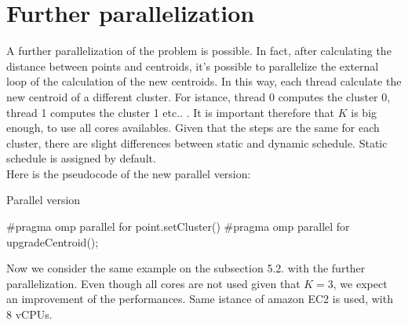 \documentclass[10pt,twocolumn,letterpaper]{article}
\begin{document}
\section{Further parallelization}
A further parallelization of the problem is possible. In fact, after calculating the distance between points and centroids, it's possible to
parallelize the external loop of the calculation of the new centroids. In this way, each thread calculate the new centroid of a different cluster.
For istance, thread 0 computes the cluster 0, thread 1 computes the cluster 1 etc.. . It is important therefore that $K$ is big enough, to use 
all cores availables. Given that the steps are the same for each cluster, there are slight differences between static and dynamic schedule.
Static schedule is assigned by default.\\
Here is the pseudocode of the new parallel version:
\begin{algorithm}
\label{newparallelo}
\caption{Parallel version}
\begin{algorithmic}
		\State \#pragma omp parallel for
			\State point.setCluster()
		\EndFor
		\State \#pragma omp parallel for
    		\State upgradeCentroid();
		\EndFor
   	 \EndWhile
\end{algorithmic}
\end{algorithm}

 Now we consider the same example on the subsection 5.2. with the further parallelization. Even though all cores are not used given 
that $K=3$, we expect an improvement of the performances. Same istance of amazon EC2 is used, with
8 vCPUs. \\
\end{document}
